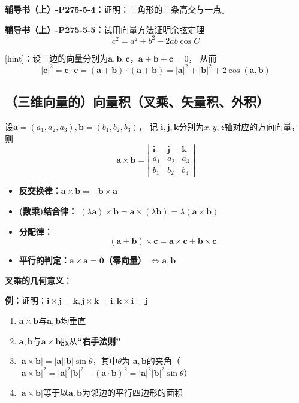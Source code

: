 {\bf 辅导书（上）-P275-5-4：}证明：三角形的三条高交与一点。

{\bf 辅导书（上）-P275-5-5：}试用向量方法证明余弦定理
$$c^2=a^2+b^2-2ab\cos C$$

[hint]：设三边的向量分别为$\bm{a},\bm{b},\bm{c}$，$\bm{a}+\bm{b}+\bm{c}=0$，
从而
$$|\bm{c}|^2=\bm{c}\cdot\bm{c}=(\bm{a}+\bm{b})\cdot(\bm{a}+\bm{b})
=|\bm{a}|^2+|\bm{b}|^2+2\cos(\bm{a},\bm{b})$$

\subsection{（三维向量的）向量积（叉乘、矢量积、外积）}

设$\bm{a}=(a_1,a_2,a_3),\bm{b}=(b_1,b_2,b_3)$， 记
$\bm{i},\bm{j},\bm{k}$分别为$x,y,z$轴对应的方向向量， 则
$$\bm{a}\times\bm{b}=\left|\begin{array}{ccc}
\bm{i} & \bm{j} & \bm{k}\\
a_1 & a_2 & a_3\\
b_1 & b_2 & b_3
\end{array}\right|$$

\begin{itemize}
  \item {\bf 反交换律：}$\bm{a}\times\bm{b}=-\bm{b}\times\bm{a}$
  \item {\bf (数乘)结合律：}
  $(\lambda\bm{a})\times\bm{b}=\bm{a}\times(\lambda\bm{b})
  =\lambda(\bm{a}\times\bm{b})$
  \item {\bf 分配律：}
  $$(\bm{a}+\bm{b})\times\bm{c}=\bm{a}\times\bm{c}+\bm{b}\times\bm{c}$$
  \item {\bf 平行的判定：}$\bm{a}\times\bm{a}=\bm{0}${\bf （零向量）}
  $\Leftrightarrow\bm{a},\bm{b}$
\end{itemize}

{\bf 叉乘的几何意义：}

{\bf 例：}证明：$\bm{i}\times\bm{j}=\bm{k},\bm{j}\times\bm{k}=\bm{i},
\bm{k}\times\bm{i}=\bm{j}$

\begin{enumerate}[(1)]
  \setlength{\itemindent}{1cm}
  \item $\bm{a}\times\bm{b}$与$\bm{a},\bm{b}$均垂直
  \item $\bm{a},\bm{b}$与$\bm{a}\times\bm{b}$服从{\bf “右手法则”}
  \item $|\bm{a}\times\bm{b}|=|\bm{a}||\bm{b}|\sin\theta$，其中$\theta$为
  $\bm{a},\bm{b}$的夹角（$|\bm{a}\times\bm{b}|^2=|\bm{a}|^2|\bm{b}|^2-
  (\bm{a}\cdot\bm{b})^2=|\bm{a}|^2|\bm{b}|^2\sin\theta$）
  \item $|\bm{a}\times\bm{b}|$等于以$\bm{a},\bm{b}$为邻边的平行四边形的面积
\end{enumerate}

